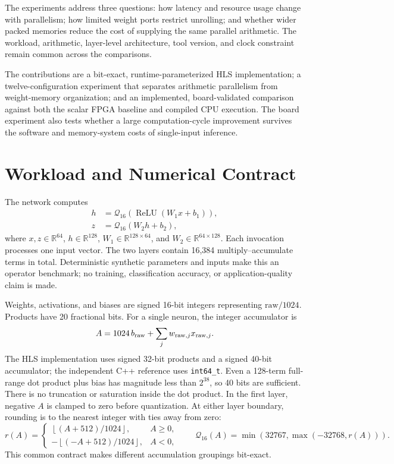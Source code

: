 \documentclass[11pt,letterpaper]{article}
\DeclareRobustCommand{\code}[1]{\nolinkurl{#1}}
\begin{document}
The experiments address three questions: how latency and resource usage change
with parallelism; how limited weight ports restrict unrolling; and whether wider
packed memories reduce the cost of supplying the same parallel arithmetic. The
workload, arithmetic, layer-level architecture, tool version, and clock constraint
remain common across the comparisons.

The contributions are a bit-exact, runtime-parameterized HLS implementation; a
twelve-configuration experiment that separates arithmetic parallelism from
weight-memory organization; and an implemented, board-validated comparison
against both the scalar FPGA baseline and compiled CPU execution. The board
experiment also tests whether a large computation-cycle improvement survives
the software and memory-system costs of single-input inference.

\section{Workload and Numerical Contract}
The network computes
\begin{align}
 h &= \mathcal{Q}_{16}\!\left(\operatorname{ReLU}(W_1x+b_1)\right),\\
 z &= \mathcal{Q}_{16}\!\left(W_2h+b_2\right),
\end{align}
where $x,z\in\mathbb{R}^{64}$, $h\in\mathbb{R}^{128}$,
$W_1\in\mathbb{R}^{128\times64}$, and
$W_2\in\mathbb{R}^{64\times128}$. Each invocation processes one input vector.
The two layers contain 16,384 multiply--accumulate terms in total. Deterministic
synthetic parameters and inputs make this an operator benchmark; no training,
classification accuracy, or application-quality claim is made.

Weights, activations, and biases are signed 16-bit integers representing
$\mathrm{raw}/1024$. Products have 20 fractional bits. For a single neuron, the
integer accumulator is
\begin{equation}
 A = 1024\,b_{\rm raw}+\sum_j w_{{\rm raw},j}x_{{\rm raw},j}.
\end{equation}
The HLS implementation uses signed 32-bit products and a signed 40-bit
accumulator; the independent C++ reference uses \code{int64_t}. Even a
128-term full-range dot product plus bias has magnitude less than $2^{38}$,
so 40 bits are sufficient. There is no truncation or saturation inside the dot
product. In the first layer, negative $A$ is clamped to zero before quantization.
At either layer boundary, rounding is to the nearest integer with ties away
from zero:
\begin{equation}
 r(A)=\begin{cases}
 \left\lfloor(A+512)/1024\right\rfloor,& A\geq0,\\
 -\left\lfloor(-A+512)/1024\right\rfloor,& A<0,
 \end{cases}
 \qquad
 \mathcal{Q}_{16}(A)=\min(32767,\max(-32768,r(A))).
\end{equation}
This common contract makes different accumulation groupings bit-exact.
\end{document}
